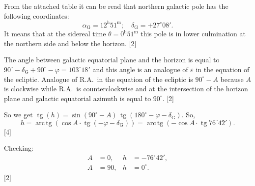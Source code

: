 From the attached table it can be read that northern galactic pole has the
following coordinates:
\[
  \alpha_{\mathrm{G}} = 12^{\mathrm{h}}51^{\mathrm{m}};\quad
  \delta_{\mathrm{G}} = +27^\circ 08'.
\]
It means that at the sidereal time
$\theta = 0^{\mathrm{h}}51^{\mathrm{m}}$ this pole is in lower culmination at
the northern side and below the horizon. \hfill[2]

The angle between galactic equatorial plane and the horizon is equal to
$90^\circ - \delta_{\mathrm{G}} + 90^\circ - \varphi = 103^\circ 18'$ and this
angle is an analogue of $\varepsilon$ in the equation of the ecliptic.
Analogue of R.A.\ in the equation of the ecliptic is $90^\circ - A$ because
$A$ is clockwise while R.A.\ is counterclockwise and at the intersection of
the horizon plane and galactic equatorial azimuth is equal to $90^\circ$.
\hfill[2]

So we get
$\operatorname{tg}(h) = \sin(90^\circ - A)\,
  \operatorname{tg}(180^\circ - \varphi - \delta_{\mathrm{G}})$. So,
\[
  h = \operatorname{arc\,tg}\left(\cos A \cdot
        \operatorname{tg}(-\varphi - \delta_{\mathrm{G}})\right)
    = \operatorname{arc\,tg}\left(-\cos A \cdot
        \operatorname{tg} 76^\circ 42'\right).
\]
\hfill[4]

Checking:
\begin{align*}
  A &= 0, & h &= -76^\circ 42', \\
  A &= 90, & h &= 0^\circ.
\end{align*}
\hfill[2]
